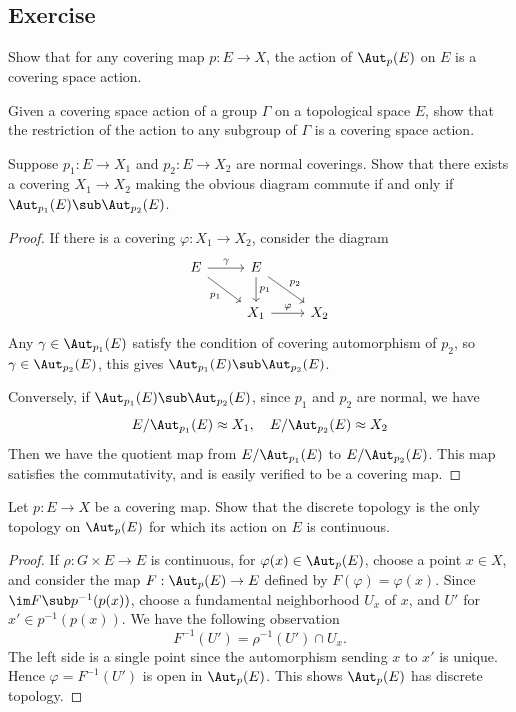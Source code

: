 \subsection{Exercise}
\begin{exercise}\label{cover is cover action}
Show that for any covering map $p:E\to X$, the action of $\Aut_p(E)$ on $E$ is a covering space action.
\end{exercise}
\begin{exercise}\label{cover action rest}
Given a covering space action of a group $\Gamma$ on a topological space $E$, show that the restriction of the action to any subgroup of $\Gamma$ is a covering space action.
\end{exercise}
\begin{exercise}
Suppose $p_1:E\to X_1$ and $p_2:E\to X_2$ are normal coverings. Show that there exists a covering $X_1\to X_2$ making the obvious diagram commute if and only if $\Aut_{p_1}(E)\sub\Aut_{p_2}(E)$.
\end{exercise}
\begin{proof}
If there is a covering $\varphi:X_1\to X_2$, consider the diagram
\[\begin{tikzcd}
E\ar[rd,swap,"p_1"]\ar[r,"\gamma"]&E\ar[d,"p_1"]\ar[rd,"p_2"]&\\
&X_1\ar[r,"\varphi"]&X_2
\end{tikzcd}\]
Any $\gamma\in\Aut_{p_1}(E)$ satisfy the condition of covering automorphism of $p_2$, so $\gamma\in\Aut_{p_2}(E)$, this gives $\Aut_{p_1}(E)\sub\Aut_{p_2}(E)$.\par
Conversely, if $\Aut_{p_1}(E)\sub\Aut_{p_2}(E)$, since $p_1$ and $p_2$ are normal, we have \[E/\Aut_{p_1}(E)\approx X_1,\quad E/\Aut_{p_2}(E)\approx X_2\]
Then we have the quotient map from $E/\Aut_{p_1}(E)$ to $E/\Aut_{p_2}(E)$. This map satisfies the commutativity, and is easily verified to be a covering map.
\end{proof}
\begin{exercise}
Let $p:E\to X$ be a covering map. Show that the discrete topology is the only topology on $\Aut_p(E)$ for which its action on $E$ is continuous.
\end{exercise}
\begin{proof}
If $\rho:G\times E\to E$ is continuous, for $\varphi(x)\in\Aut_p(E)$, choose a point $x\in X$, and consider the map $F:\Aut_p(E)\to E$ defined by $F(\varphi)=\varphi(x)$. Since $\im F\sub p^{-1}(p(x))$, choose a fundamental neighborhood $U_x$ of $x$, and $U'$ for $x'\in p^{-1}(p(x))$. We have the following observation
\[F^{-1}(U')=\rho^{-1}(U')\cap U_x.\]
The left side is a single point since the automorphism sending $x$ to $x'$ is unique. Hence $\varphi=F^{-1}(U')$ is open in $\Aut_p(E)$. This shows $\Aut_p(E)$ has discrete topology.
\end{proof}
